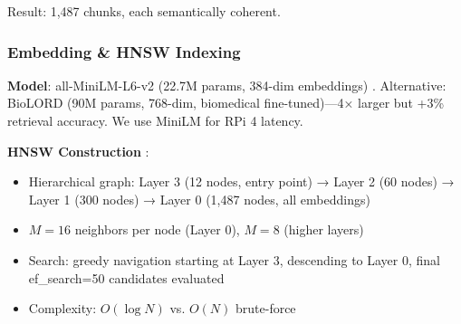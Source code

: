 \documentclass[conference,compsoc]{IEEEtran}
\begin{document}
Result: 1,487 chunks, each semantically coherent.

\subsubsection{Embedding \& HNSW Indexing}
\textbf{Model}: all-MiniLM-L6-v2 (22.7M params, 384-dim embeddings) \cite{sentence_transformers}. Alternative: BioLORD (90M params, 768-dim, biomedical fine-tuned)—4× larger but +3\% retrieval accuracy. We use MiniLM for RPi 4 latency.

\textbf{HNSW Construction} \cite{hnsw_malkov_2018}:
\begin{itemize}
    \item Hierarchical graph: Layer 3 (12 nodes, entry point) → Layer 2 (60 nodes) → Layer 1 (300 nodes) → Layer 0 (1,487 nodes, all embeddings)
    \item \(M=16\) neighbors per node (Layer 0), \(M=8\) (higher layers)
    \item Search: greedy navigation starting at Layer 3, descending to Layer 0, final ef\_search=50 candidates evaluated
    \item Complexity: \(O(\log N)\) vs. \(O(N)\) brute-force
\end{itemize}
\end{document}
